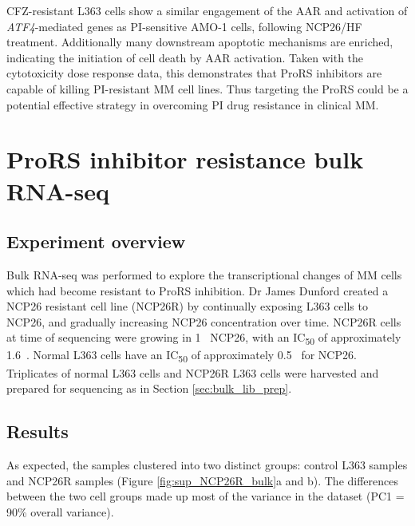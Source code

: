 CFZ-resistant L363 cells show a similar engagement of the AAR and activation of \textit{ATF4}-mediated genes as PI-sensitive AMO-1 cells, following NCP26/HF treatment.
Additionally many downstream apoptotic mechanisms are enriched, indicating the initiation of cell death by AAR activation.
Taken with the cytotoxicity dose response data, this demonstrates that ProRS inhibitors are capable of killing PI-resistant MM cell lines.
Thus targeting the ProRS could be a potential effective strategy in overcoming PI drug resistance in clinical MM\@.

\section{ProRS inhibitor resistance bulk RNA-seq}

\subsection{Experiment overview}
Bulk RNA-seq was performed to explore the transcriptional changes of MM cells which had become resistant to ProRS inhibition.
Dr James Dunford created a NCP26 resistant cell line (NCP26R) by continually exposing L363 cells to NCP26, and gradually increasing NCP26 concentration over time.
NCP26R cells at time of sequencing were growing in 1\si{\micro\Molar} NCP26, with an IC\textsubscript{50} of approximately 1.6\si{\micro\Molar}.
Normal L363 cells have an IC\textsubscript{50} of approximately 0.5\si{\micro\Molar} for NCP26.
Triplicates of normal L363 cells and NCP26R L363 cells were harvested and prepared for sequencing as in Section \ref{sec:bulk_lib_prep}.

\subsection{Results}
As expected, the samples clustered into two distinct groups: control L363 samples and NCP26R samples (Figure \ref{fig:sup_NCP26R_bulk}a and b).
The differences between the two cell groups made up most of the variance in the dataset (PC1 = 90\% overall variance).

